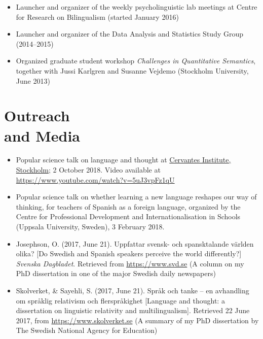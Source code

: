 \documentclass[margin, 11pt]{res} %
\begin{document}
\begin{resume}
\begin{itemize}
\item Launcher and organizer of the weekly psycholinguistic lab meetings at Centre for Research on Bilingualism (started January 2016)

\item Launcher and organizer of the Data Analysis and Statistics Study Group (2014--2015)

\item Organized graduate student workshop \emph{Challenges in Quantitative Semantics}, together with Jussi Karlgren and Susanne Vejdemo (Stockholm University, June 2013)

\end{itemize}



\section{\sc Outreach \\and Media}

\begin{itemize}

\item Popular science talk on language and thought at \href{https://cultura.cervantes.es/estocolmo/es/-hablas-como-piensas--la-relacion-entre-el-lenguaje-y-el-pensamiento/122695}{Cervantes Institute, Stockholm}; 2 October 2018.
Video available at \url{https://www.youtube.com/watch?v=5uJ3vpFz1qU}

\item Popular science talk on whether learning a new language reshapes our way of thinking, for teachers of Spanish as a foreign language, organized by the Centre for Professional Development and Internationalisation in Schools (Uppsala University, Sweden), 3 February 2018.

\item Josephson, O. (2017, June 21). Uppfattar svensk- och spansktalande v{\"a}rlden olika? [Do Swedish and Spanish speakers perceive the world differently?] \emph{Svenska Dagbladet}. Retrieved from \url{https://www.svd.se} (A column on my PhD dissertation in one of the major Swedish daily newspapers)

\item Skolverket, \& Sayehli, S. (2017, June 21). Spr{\aa}k och tanke -- en avhandling om spr{\aa}klig relativism och flerspr{\aa}kighet [Language and thought: a dissertation on linguistic relativity and multilingualism]. Retrieved 22 June 2017, from \url{https://www.skolverket.se} (A summary of my PhD dissertation by The Swedish National Agency for Education)


\end{itemize}
\end{resume}
\end{document}
